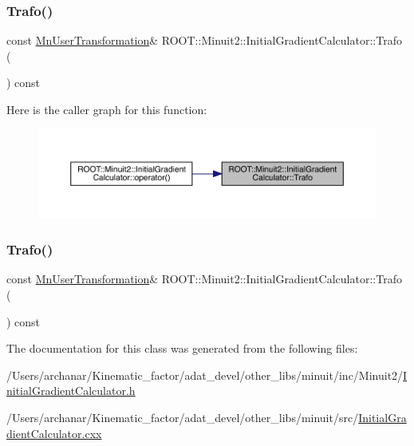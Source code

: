 \subsubsection{\texorpdfstring{Trafo()}{Trafo()}\hspace{0.1cm}{\footnotesize\ttfamily [1/2]}}
{\footnotesize\ttfamily const \mbox{\hyperlink{classROOT_1_1Minuit2_1_1MnUserTransformation}{Mn\+User\+Transformation}}\& R\+O\+O\+T\+::\+Minuit2\+::\+Initial\+Gradient\+Calculator\+::\+Trafo (\begin{DoxyParamCaption}{ }\end{DoxyParamCaption}) const\hspace{0.3cm}{\ttfamily [inline]}}

Here is the caller graph for this function\+:\nopagebreak
\begin{figure}[H]
\begin{center}
\leavevmode
\includegraphics[width=350pt]{d3/dcf/classROOT_1_1Minuit2_1_1InitialGradientCalculator_aba7febb81b50fd961a9f7f754413a5c9_icgraph}
\end{center}
\end{figure}
\mbox{\label{classROOT_1_1Minuit2_1_1InitialGradientCalculator_aba7febb81b50fd961a9f7f754413a5c9}} 
\subsubsection{\texorpdfstring{Trafo()}{Trafo()}\hspace{0.1cm}{\footnotesize\ttfamily [2/2]}}
{\footnotesize\ttfamily const \mbox{\hyperlink{classROOT_1_1Minuit2_1_1MnUserTransformation}{Mn\+User\+Transformation}}\& R\+O\+O\+T\+::\+Minuit2\+::\+Initial\+Gradient\+Calculator\+::\+Trafo (\begin{DoxyParamCaption}{ }\end{DoxyParamCaption}) const\hspace{0.3cm}{\ttfamily [inline]}}



The documentation for this class was generated from the following files\+:\begin{DoxyCompactItemize}
\item 
/\+Users/archanar/\+Kinematic\+\_\+factor/adat\+\_\+devel/other\+\_\+libs/minuit/inc/\+Minuit2/\mbox{\hyperlink{other__libs_2minuit_2inc_2Minuit2_2InitialGradientCalculator_8h}{Initial\+Gradient\+Calculator.\+h}}\item 
/\+Users/archanar/\+Kinematic\+\_\+factor/adat\+\_\+devel/other\+\_\+libs/minuit/src/\mbox{\hyperlink{InitialGradientCalculator_8cxx}{Initial\+Gradient\+Calculator.\+cxx}}\end{DoxyCompactItemize}
